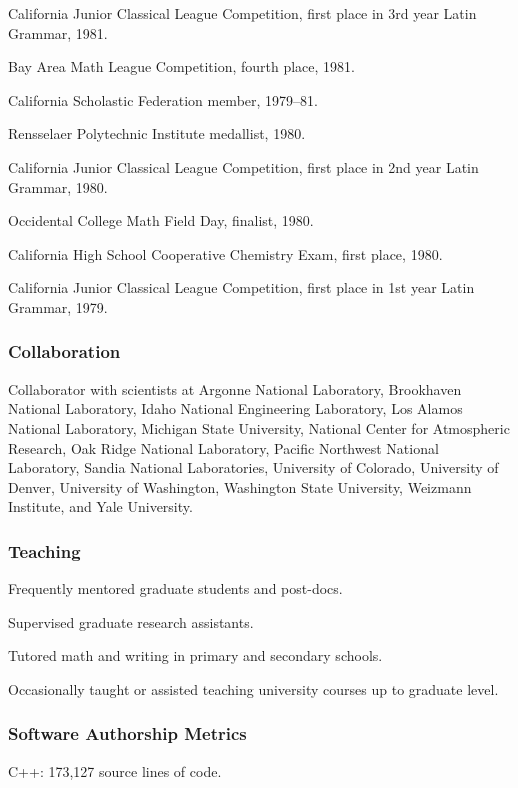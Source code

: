\documentclass[]{article}
\begin{document}
California Junior Classical League Competition, first place in 3rd year
Latin Grammar, 1981.

Bay Area Math League Competition, fourth place, 1981.

California Scholastic Federation member, 1979--81.

Rensselaer Polytechnic Institute medallist, 1980.

California Junior Classical League Competition, first place in 2nd year
Latin Grammar, 1980.

Occidental College Math Field Day, finalist, 1980.

California High School Cooperative Chemistry Exam, first place, 1980.

California Junior Classical League Competition, first place in 1st year
Latin Grammar, 1979.

\subsubsection{Collaboration}\label{collaboration}

Collaborator with scientists at Argonne National Laboratory, Brookhaven
National Laboratory, Idaho National Engineering Laboratory, Los Alamos
National Laboratory, Michigan State University, National Center for
Atmospheric Research, Oak Ridge National Laboratory, Pacific Northwest
National Laboratory, Sandia National Laboratories, University of
Colorado, University of Denver, University of Washington, Washington
State University, Weizmann Institute, and Yale University.

\subsubsection{Teaching}\label{teaching}

Frequently mentored graduate students and post-docs.

Supervised graduate research assistants.

Tutored math and writing in primary and secondary schools.

Occasionally taught or assisted teaching university courses up to
graduate level.

\subsubsection{Software Authorship
Metrics}\label{software-authorship-metrics}

C++: 173,127 source lines of code.
\end{document}
